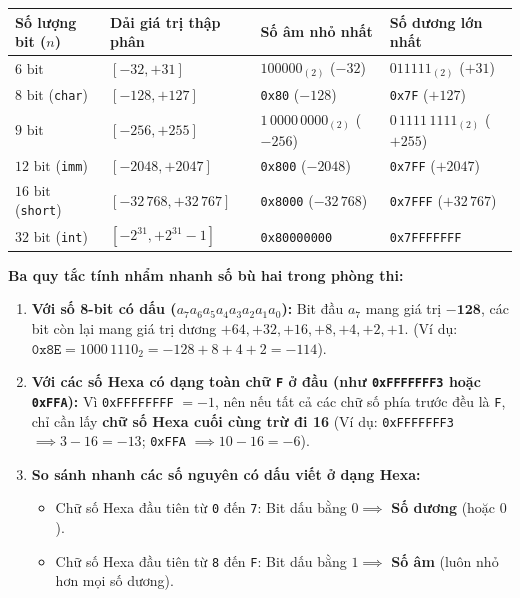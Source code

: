 \begin{tcolorbox}[bwbox, title={Bảng dải biểu diễn của Số nguyên có dấu và Mẹo tính nhẩm nhanh}]
\begin{center}
\renewcommand{\arraystretch}{1.2}
\small
\begin{tabularx}{\linewidth}{|L{2.6cm}|C{3.6cm}|C{3.2cm}|Y|}
\hline
\textbf{Số lượng bit ($n$)} & \textbf{Dải giá trị thập phân} & \textbf{Số âm nhỏ nhất} & \textbf{Số dương lớn nhất} \\ \hline
$6\text{ bit}$ & $[-32, +31]$ & $100000_{(2)}$ ($-32$) & $011111_{(2)}$ ($+31$) \\ \hline
$8\text{ bit}$ (\texttt{char}) & $[-128, +127]$ & \texttt{0x80} ($-128$) & \texttt{0x7F} ($+127$) \\ \hline
$9\text{ bit}$ & $[-256, +255]$ & $1\,0000\,0000_{(2)}$ ($-256$) & $0\,1111\,1111_{(2)}$ ($+255$) \\ \hline
$12\text{ bit}$ (\texttt{imm}) & $[-2048, +2047]$ & \texttt{0x800} ($-2048$) & \texttt{0x7FF} ($+2047$) \\ \hline
$16\text{ bit}$ (\texttt{short}) & $[-32\,768, +32\,767]$ & \texttt{0x8000} ($-32\,768$) & \texttt{0x7FFF} ($+32\,767$) \\ \hline
$32\text{ bit}$ (\texttt{int}) & $[-2^{31}, +2^{31}-1]$ & \texttt{0x80000000} & \texttt{0x7FFFFFFF} \\ \hline
\end{tabularx}
\end{center}
\textbf{Ba quy tắc tính nhẩm nhanh số bù hai trong phòng thi:}
\begin{enumerate}
    \item \textbf{Với số 8-bit có dấu ($a_7a_6a_5a_4a_3a_2a_1a_0$):} Bit đầu $a_7$ mang giá trị $\mathbf{-128}$, các bit còn lại mang giá trị dương $+64, +32, +16, +8, +4, +2, +1$. (Ví dụ: $\texttt{0x8E} = 1000\,1110_2 = -128 + 8 + 4 + 2 = -114$).
    \item \textbf{Với các số Hexa có dạng toàn chữ \texttt{F} ở đầu (như \texttt{0xFFFFFFF3} hoặc \texttt{0xFFA}):} Vì \texttt{0xFFFFFFFF} $= -1$, nên nếu tất cả các chữ số phía trước đều là \texttt{F}, chỉ cần lấy \textbf{chữ số Hexa cuối cùng trừ đi 16} (Ví dụ: \texttt{0xFFFFFFF3} $\implies 3 - 16 = -13$; \texttt{0xFFA} $\implies 10 - 16 = -6$).
    \item \textbf{So sánh nhanh các số nguyên có dấu viết ở dạng Hexa:}
    \begin{itemize}
        \item Chữ số Hexa đầu tiên từ \texttt{0} đến \texttt{7}: Bit dấu bằng $0 \implies$ \textbf{Số dương} (hoặc $0$).
        \item Chữ số Hexa đầu tiên từ \texttt{8} đến \texttt{F}: Bit dấu bằng $1 \implies$ \textbf{Số âm} (luôn nhỏ hơn mọi số dương).
    \end{itemize}
\end{enumerate}
\end{tcolorbox}

